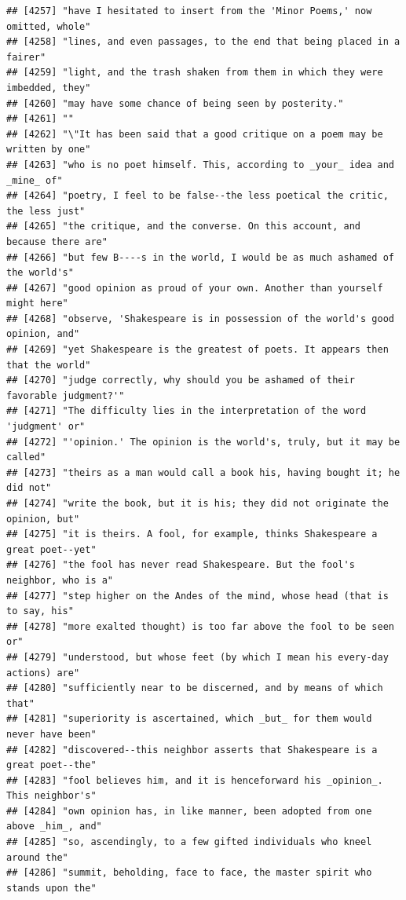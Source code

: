 \documentclass{article}\usepackage[]{graphicx}\usepackage[]{color}
\makeatletter
\newenvironment{kframe}{%
 \def\at@end@of@kframe{}%
 \ifinner\ifhmode%
  \def\at@end@of@kframe{\end{minipage}}%
  \begin{minipage}{\columnwidth}%
 \fi\fi%
 \def\FrameCommand##1{\hskip\@totalleftmargin \hskip-\fboxsep
 \colorbox{shadecolor}{##1}\hskip-\fboxsep
     \hskip-\linewidth \hskip-\@totalleftmargin \hskip\columnwidth}%
 \MakeFramed {\advance\hsize-\width
   \@totalleftmargin\z@ \linewidth\hsize
   \@setminipage}}%
 {\par\unskip\endMakeFramed%
 \at@end@of@kframe}
\newenvironment{knitrout}{}{} %
\makeatother
\begin{document}
\begin{knitrout}
\begin{kframe}
\begin{verbatim}
## [4257] "have I hesitated to insert from the 'Minor Poems,' now omitted, whole"       
## [4258] "lines, and even passages, to the end that being placed in a fairer"          
## [4259] "light, and the trash shaken from them in which they were imbedded, they"     
## [4260] "may have some chance of being seen by posterity."                            
## [4261] ""                                                                            
## [4262] "\"It has been said that a good critique on a poem may be written by one"     
## [4263] "who is no poet himself. This, according to _your_ idea and _mine_ of"        
## [4264] "poetry, I feel to be false--the less poetical the critic, the less just"     
## [4265] "the critique, and the converse. On this account, and because there are"      
## [4266] "but few B----s in the world, I would be as much ashamed of the world's"      
## [4267] "good opinion as proud of your own. Another than yourself might here"         
## [4268] "observe, 'Shakespeare is in possession of the world's good opinion, and"     
## [4269] "yet Shakespeare is the greatest of poets. It appears then that the world"    
## [4270] "judge correctly, why should you be ashamed of their favorable judgment?'"    
## [4271] "The difficulty lies in the interpretation of the word 'judgment' or"         
## [4272] "'opinion.' The opinion is the world's, truly, but it may be called"          
## [4273] "theirs as a man would call a book his, having bought it; he did not"         
## [4274] "write the book, but it is his; they did not originate the opinion, but"      
## [4275] "it is theirs. A fool, for example, thinks Shakespeare a great poet--yet"     
## [4276] "the fool has never read Shakespeare. But the fool's neighbor, who is a"      
## [4277] "step higher on the Andes of the mind, whose head (that is to say, his"       
## [4278] "more exalted thought) is too far above the fool to be seen or"               
## [4279] "understood, but whose feet (by which I mean his every-day actions) are"      
## [4280] "sufficiently near to be discerned, and by means of which that"               
## [4281] "superiority is ascertained, which _but_ for them would never have been"      
## [4282] "discovered--this neighbor asserts that Shakespeare is a great poet--the"     
## [4283] "fool believes him, and it is henceforward his _opinion_. This neighbor's"    
## [4284] "own opinion has, in like manner, been adopted from one above _him_, and"     
## [4285] "so, ascendingly, to a few gifted individuals who kneel around the"           
## [4286] "summit, beholding, face to face, the master spirit who stands upon the"      

\end{verbatim}
\end{kframe}
\end{knitrout}
\end{document}
